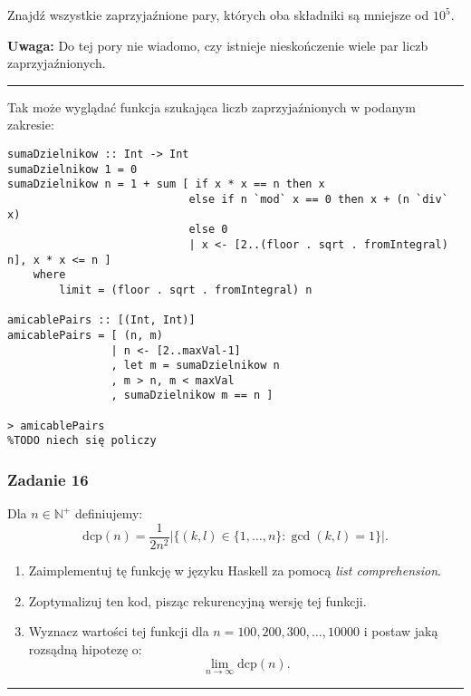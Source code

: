 \documentclass[11pt,a4paper]{article}
\begin{document}
Znajdź wszystkie zaprzyjaźnione pary, których oba składniki są mniejsze od \(10^5\).

\textbf{Uwaga:} Do tej pory nie wiadomo, czy istnieje nieskończenie wiele par liczb zaprzyjaźnionych.

\bigskip
\hrule
\bigskip

Tak może wyglądać funkcja szukająca liczb zaprzyjaźnionych w podanym zakresie:
\begin{Verbatim}[frame=single]
sumaDzielnikow :: Int -> Int
sumaDzielnikow 1 = 0
sumaDzielnikow n = 1 + sum [ if x * x == n then x
                            else if n `mod` x == 0 then x + (n `div` x)
                            else 0
                            | x <- [2..(floor . sqrt . fromIntegral) n], x * x <= n ]
    where
        limit = (floor . sqrt . fromIntegral) n

amicablePairs :: [(Int, Int)]
amicablePairs = [ (n, m)
                | n <- [2..maxVal-1]
                , let m = sumaDzielnikow n
                , m > n, m < maxVal
                , sumaDzielnikow m == n ]

> amicablePairs
%TODO niech się policzy
\end{Verbatim}

\subsubsection{Zadanie 16}
Dla \(n \in \mathbb{N}^+\) definiujemy:
\begin{equation}
    \text{dcp}(n) = \frac{1}{2 n^2} \left| \{(k, l) \in \{1, \dots, n\} : \gcd(k, l) = 1\} \right|.
\end{equation}

\begin{enumerate}
    \item Zaimplementuj tę funkcję w języku Haskell za pomocą \textit{list comprehension}.
    \item Zoptymalizuj ten kod, pisząc rekurencyjną wersję tej funkcji.
    \item Wyznacz wartości tej funkcji dla \(n = 100, 200, 300, \dots, 10000\) i postaw jaką rozsądną hipotezę o:
        \begin{equation}
            \lim\limits_{n \to \infty} \text{dcp}(n).
        \end{equation}
\end{enumerate}

\bigskip
\hrule
\bigskip
\end{document}
